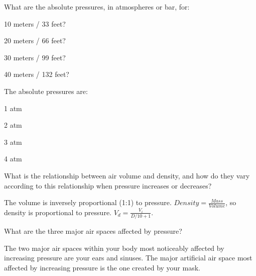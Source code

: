 	\begin{qanda}
		\begin{question}
What are the absolute pressures, in atmospheres or bar, for:
			\begin{nospacebulletedlist}
				\item 10 meters / 33 feet?
				\item 20 meters / 66 feet?
				\item 30 meters / 99 feet?
				\item 40 meters / 132 feet?
			\end{nospacebulletedlist}
		\end{question}

		\begin{answer}
The absolute pressures are:
			\begin{nospacebulletedlist}
				\item 1 atm
				\item 2 atm
				\item 3 atm
				\item 4 atm
			\end{nospacebulletedlist}
		\end{answer}
	\end{qanda}

	\begin{qanda}
		\begin{question}
What is the relationship between air volume and density, and how do they vary according to this relationship when pressure increases or decreases?
		\end{question}

		\begin{answer}
The volume is inversely proportional (1:1) to pressure.  $Density = \frac{Mass}{Volume}$, so density is proportional to pressure.  $V_d = \frac{V_i}{D/10 + 1}$.
		\end{answer}
	\end{qanda}

	\begin{qanda}
		\begin{question}
What are the three major air spaces affected by pressure?
		\end{question}

		\begin{answer}
The two major air spaces within your body most noticeably affected by increasing pressure are your ears and sinuses.  The major artificial air space most affected by increasing pressure is the one created by your mask.
		\end{answer}
	\end{qanda}

